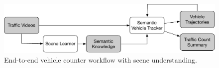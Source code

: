 \begin{figure}
\centering
\includegraphics[width=\linewidth]{./img/system/semantic-counter.pdf}
\caption{End-to-end vehicle counter workflow with scene understanding.}
\label{fig:semantic-counter}
\end{figure}